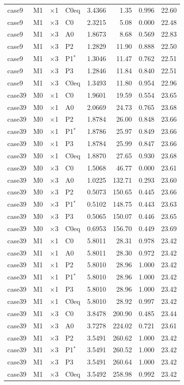 {\begin{longtable}{llllrrrr}
case9 & M1 & $\times$1 & C0eq & 3.4366 & 1.35 & 0.996 & 22.60\\
case9 & M1 & $\times$3 & C0 & 2.3215 & 5.08 & 0.000 & 22.48\\
case9 & M1 & $\times$3 & A0 & 1.8673 & 8.68 & 0.569 & 22.83\\
case9 & M1 & $\times$3 & P2 & 1.2829 & 11.90 & 0.888 & 22.50\\
case9 & M1 & $\times$3 & P1$^*$ & 1.3046 & 11.47 & 0.762 & 22.51\\
case9 & M1 & $\times$3 & P3 & 1.2846 & 11.84 & 0.840 & 22.51\\
case9 & M1 & $\times$3 & C0eq & 1.3493 & 11.80 & 0.954 & 22.96\\
case39 & M0 & $\times$1 & C0 & 1.9601 & 19.59 & 0.554 & 23.65\\
case39 & M0 & $\times$1 & A0 & 2.0669 & 24.73 & 0.765 & 23.68\\
case39 & M0 & $\times$1 & P2 & 1.8784 & 26.00 & 0.848 & 23.66\\
case39 & M0 & $\times$1 & P1$^*$ & 1.8786 & 25.97 & 0.849 & 23.66\\
case39 & M0 & $\times$1 & P3 & 1.8784 & 25.99 & 0.847 & 23.66\\
case39 & M0 & $\times$1 & C0eq & 1.8870 & 27.65 & 0.930 & 23.68\\
case39 & M0 & $\times$3 & C0 & 1.5068 & 46.77 & 0.000 & 23.61\\
case39 & M0 & $\times$3 & A0 & 1.0225 & 132.71 & 0.293 & 23.60\\
case39 & M0 & $\times$3 & P2 & 0.5073 & 150.65 & 0.445 & 23.66\\
case39 & M0 & $\times$3 & P1$^*$ & 0.5102 & 148.75 & 0.443 & 23.63\\
case39 & M0 & $\times$3 & P3 & 0.5065 & 150.07 & 0.446 & 23.65\\
case39 & M0 & $\times$3 & C0eq & 0.6953 & 156.70 & 0.449 & 23.69\\
case39 & M1 & $\times$1 & C0 & 5.8011 & 28.31 & 0.978 & 23.42\\
case39 & M1 & $\times$1 & A0 & 5.8011 & 28.30 & 0.972 & 23.42\\
case39 & M1 & $\times$1 & P2 & 5.8010 & 28.96 & 1.000 & 23.42\\
case39 & M1 & $\times$1 & P1$^*$ & 5.8010 & 28.96 & 1.000 & 23.42\\
case39 & M1 & $\times$1 & P3 & 5.8010 & 28.96 & 1.000 & 23.42\\
case39 & M1 & $\times$1 & C0eq & 5.8010 & 28.92 & 0.997 & 23.42\\
case39 & M1 & $\times$3 & C0 & 3.8478 & 200.90 & 0.485 & 23.44\\
case39 & M1 & $\times$3 & A0 & 3.7278 & 224.02 & 0.721 & 23.61\\
case39 & M1 & $\times$3 & P2 & 3.5491 & 260.62 & 1.000 & 23.42\\
case39 & M1 & $\times$3 & P1$^*$ & 3.5491 & 260.52 & 1.000 & 23.42\\
case39 & M1 & $\times$3 & P3 & 3.5491 & 260.64 & 1.000 & 23.42\\
case39 & M1 & $\times$3 & C0eq & 3.5492 & 258.98 & 0.992 & 23.42\\
\end{longtable}
}

